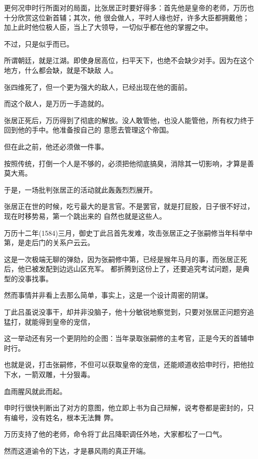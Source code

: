 \documentclass[11pt,a4paper,onecolumn]{article}
\begin{document}
更何况申时行所面对的局面，比张居正时要好得多：首先他是皇帝的老师，万历也十分欣赏这位新首辅；其次，他
很会做人，平时人缘也好，许多大臣都拥戴他；加上此时他位极人臣，当上了大领导，一切似乎都在他的掌握之中。

不过，只是似乎而已。

所谓朝廷，就是江湖。即使身居高位，扫平天下，也绝不会缺少对手。因为在这个地方，什么都会缺，就是不缺敌
人。

张四维死了，但一个更为强大的敌人，已经出现在他的面前。

而这个敌人，是万历一手造就的。

张居正死后，万历得到了彻底的解放。没人敢管他，也没人能管他，所有权力终于回到他的手中。他准备按自己的
意愿去管理这个帝国。

但在此之前，他还必须做一件事。

按照传统，打倒一个人是不够的，必须把他彻底搞臭，消除其一切影响，才算是善莫大焉。

于是，一场批判张居正的活动就此轰轰烈烈展开。

张居正在世的时候，吃亏最大的是言官。不是罢官，就是打屁股，日子很不好过，现在时移势易，第一个跳出来的
自然也就是这些人。

万历十二年(1584)三月，御史丁此吕首先发难，攻击张居正之子张嗣修当年科举中第，是走后门的关系户云云。

这是一次极端无聊的弹劾，因为张嗣修中第，已经是猴年马月的事，而张居正死后，他已被发配到边远山区充军。
都折腾到这份上了，还要追究考试问题，是典型的没事找事。

然而事情并非看上去那么简单，事实上，这是一个设计周密的阴谋。

丁此吕虽说没事干，却并非没脑子，他十分敏锐地察觉到，只要对张居正问题穷追猛打，就能得到皇帝的宠信，

这一举动还有另一个更阴险的企图：当年录取张嗣修的主考官，正是今天的首辅申时行。

也就是说，打击张嗣修，不但可以获取皇帝的宠信，还能顺道收拾申时行，把他拉下水，一箭双雕，十分狠毒。

血雨腥风就此而起。

申时行很快判断出了对方的意图，他立即上书为自己辩解，说考卷都是密封的，只有编号，没有姓名，根本无法舞
弊。

万历支持了他的老师，命令将丁此吕降职调任外地，大家都松了一口气。

然而这道谕令的下达，才是暴风雨的真正开端。

\section[\thesection]{}
\end{document}
